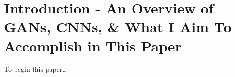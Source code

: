 \chapter{Introduction - An Overview of GANs, CNNs, \& What I Aim To Accomplish in This Paper}
To begin this paper\dots